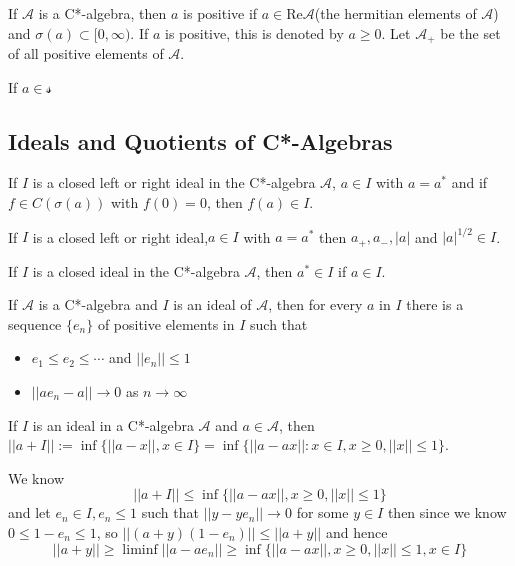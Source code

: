 \begin{definition}
    If $\mathcal{A}$ is a C*-algebra, then $a$ is positive if $a\in \text{Re} \mathcal{A}$(the hermitian elements of $\mathcal{A}$) and $\sigma(a) \subset [0,\infty)$. If $a$ is positive, this is denoted by $a\geq 0$. Let $\mathcal{A}_+$ be the set of all positive elements of $\mathcal{A}$.
\end{definition}

\begin{proposition}
    If $a\in\mathcal{s}$
\end{proposition}

\subsection{Ideals and Quotients of C*-Algebras}

\begin{proposition}
    If $I$ is a closed left or right ideal in the C*-algebra $\mathcal{A}$, $a\in I$ with $a = a^*$ and if $f\in C(\sigma(a))$ with $f(0) = 0$, then $f(a)\in I$.
\end{proposition}

\begin{corollary}
    If $I$ is a closed left or right ideal,$a\in I$ with $a = a^*$ then $a_+,a_-, |a|$ and $|a|^{1/2}\in I$.
\end{corollary}

\begin{theorem}
    If $I$ is a closed ideal in the C*-algebra $\mathcal{A}$, then $a^* \in I$ if $a\in I$.
\end{theorem}

\begin{proposition}
    If $\mathcal{A}$ is a C*-algebra and $I$ is an ideal of $\mathcal{A}$, then for every $a$ in $I$ there is a sequence $\{e_n\}$ of positive elements in $I$ such that
    \begin{itemize}
        \item $e_1\leq e_2\leq \cdots$ and $||e_n|| \leq 1$
        \item $||ae_n - a|| \to 0$ as $n\to \infty$
    \end{itemize}
\end{proposition} 

\begin{lemma}
    If $I$ is an ideal in a C*-algebra $\mathcal{A}$ and $a\in\mathcal{A}$, then $||a+I||:= \inf\{||a-x||,x\in I\} = \inf\{||a-ax||:x\in I, x\geq 0, ||x||\leq 1\}$.
\end{lemma}
\Pf\par
    We know
    \[||a+I|| \leq \inf\{||a-ax||, x\geq 0, ||x|| \leq 1\}\]
    and let $e_n\in I, e_n\leq 1$ such that $||y-ye_n|| \to 0$ for some $y\in I$ then since we know $0\leq 1- e_n \leq 1$, so $||(a+y)(1-e_n)|| \leq ||a+y||$ and hence
    \[
    ||a+y|| \geq \liminf ||a-ae_n|| \geq \inf\{||a-ax||, x\geq 0, ||x|| \leq 1, x\in I\}
    \]


